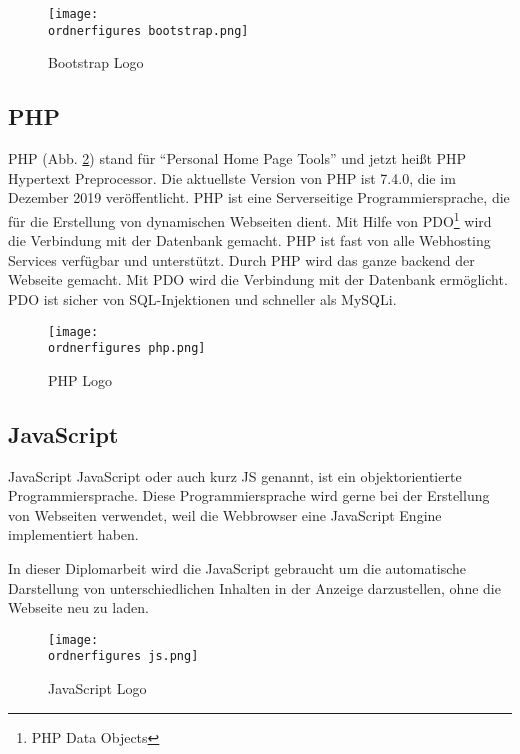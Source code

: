 \begin{figure}[H]
	\centering
	\texttt{[image: \\ordnerfigures bootstrap.png]}
	\caption{Bootstrap Logo\cite{40_bootstrap_img}}
	\label{fi:bootstrap}
\end{figure}

\subsection{PHP}
PHP (Abb. \ref{fi:php}) stand f\"{u}r \textquotedblleft{}Personal Home Page Tools\textquotedblright{} und jetzt hei\ss{}t PHP Hypertext Preprocessor. Die aktuellste Version von PHP ist 7.4.0, die im Dezember 2019 ver\"{o}ffentlicht. PHP ist eine Serverseitige Programmiersprache, die f\"{u}r die Erstellung von dynamischen Webseiten dient. Mit Hilfe von PDO\footnote{PHP Data Objects} wird die Verbindung mit der Datenbank gemacht. PHP ist fast von alle Webhosting Services verf\"{u}gbar und unterst\"{u}tzt. 
Durch PHP wird das ganze backend der Webseite gemacht. Mit PDO wird die Verbindung mit der Datenbank erm\"{o}glicht. PDO ist sicher von SQL-Injektionen und schneller als MySQLi.



\begin{figure}[H]
	\centering
	\texttt{[image: \\ordnerfigures php.png]}
	\caption{PHP Logo\cite{40_php_img}}
	\label{fi:php}
\end{figure}


\subsection{JavaScript}
JavaScript JavaScript oder auch kurz JS genannt, ist ein objektorientierte Programmiersprache. Diese Programmiersprache wird gerne bei der Erstellung von Webseiten verwendet, weil die Webbrowser eine JavaScript Engine implementiert haben.\cite{40_js}

In dieser Diplomarbeit wird die JavaScript gebraucht um die automatische Darstellung von unterschiedlichen Inhalten in der Anzeige darzustellen, ohne die Webseite neu zu laden.


\begin{figure}[H]
	\centering
	\texttt{[image: \\ordnerfigures js.png]}
	\caption{JavaScript Logo\cite{40_js_img}}
	\label{fi:js}
\end{figure}



